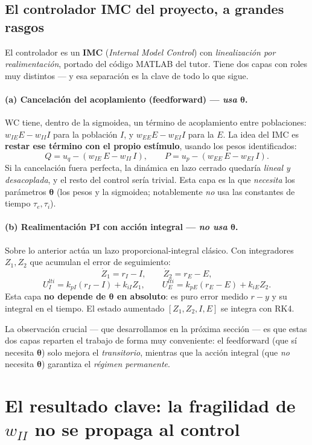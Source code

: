 \documentclass[11pt,a4paper]{article}
\newcommand{\thetavec}{\bm{\theta}}
\begin{document}
\subsection*{El controlador IMC del proyecto, a grandes rasgos}

El controlador es un \textbf{IMC} (\emph{Internal Model Control}) con \emph{linealización por realimentación}, portado del código MATLAB del tutor. Tiene dos capas con roles muy distintos --- y esa separación es la clave de todo lo que sigue.

\paragraph{(a) Cancelación del acoplamiento (feedforward) --- \emph{usa} $\thetavec$.} WC tiene, dentro de la sigmoidea, un término de acoplamiento entre poblaciones: $w_{IE}E - w_{II}I$ para la población $I$, y $w_{EE}E - w_{EI}I$ para la $E$. La idea del IMC es \textbf{restar ese término con el propio estímulo}, usando los pesos identificados:
$$Q = u_q - (w_{IE}\,E - w_{II}\,I), \qquad P = u_p - (w_{EE}\,E - w_{EI}\,I).$$
Si la cancelación fuera perfecta, la dinámica en lazo cerrado quedaría \emph{lineal y desacoplada}, y el resto del control sería trivial. Esta capa es la que \emph{necesita} los parámetros $\thetavec$ (los pesos y la sigmoidea; notablemente \emph{no} usa las constantes de tiempo $\tau_e, \tau_i$).

\paragraph{(b) Realimentación PI con acción integral --- \emph{no usa} $\thetavec$.} Sobre lo anterior actúa un lazo proporcional-integral clásico. Con integradores $Z_1, Z_2$ que acumulan el error de seguimiento:
$$\dot Z_1 = r_I - I, \qquad \dot Z_2 = r_E - E,$$
$$U^{lti}_I = k_{pI}(r_I - I) + k_{iI}Z_1, \qquad U^{lti}_E = k_{pE}(r_E - E) + k_{iE}Z_2.$$
Esta capa \textbf{no depende de $\thetavec$ en absoluto}: es puro error medido $r - y$ y su integral en el tiempo. El estado aumentado $[Z_1, Z_2, I, E]$ se integra con RK4.

La observación crucial --- que desarrollamos en la próxima sección --- es que estas dos capas reparten el trabajo de forma muy conveniente: el feedforward (que sí necesita $\thetavec$) solo mejora el \emph{transitorio}, mientras que la acción integral (que \emph{no} necesita $\thetavec$) garantiza el \emph{régimen permanente}.

\section{El resultado clave: la fragilidad de \texorpdfstring{$w_{II}$}{wII} no se propaga al control}
\end{document}
